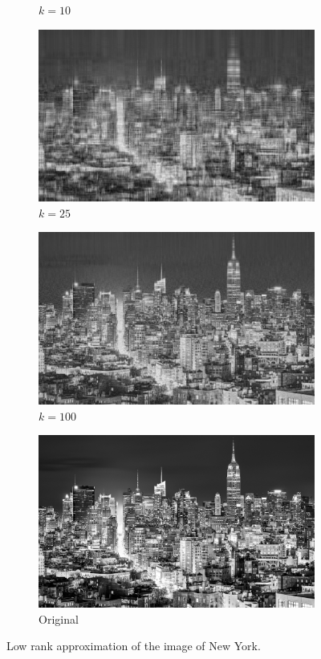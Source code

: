 \documentclass[11pt,a4paper]{article}
\begin{document}
\begin{figure}[H]
\begin{subfigure}[t]{.5\textwidth}
    \caption{$k = 10$}
  \end{subfigure}%
  \begin{subfigure}[t]{.5\textwidth}
    \centering
    \includegraphics[scale=0.15]{img/k25_new_york}
    \caption{$k = 25$}
  \end{subfigure}
  \begin{subfigure}[t]{.5\textwidth}
    \centering
    \includegraphics[scale=0.15]{img/k100_new_york}
    \caption{$k = 100$}
  \end{subfigure}%
  \begin{subfigure}[t]{.5\textwidth}
    \centering
    \includegraphics[scale=0.15]{img/new_york}
    \caption{Original}
  \end{subfigure}%
  \caption{Low rank approximation of the image of New York.}
  \label{fig:new-york-lr-approximation}
\end{figure}
\end{document}
